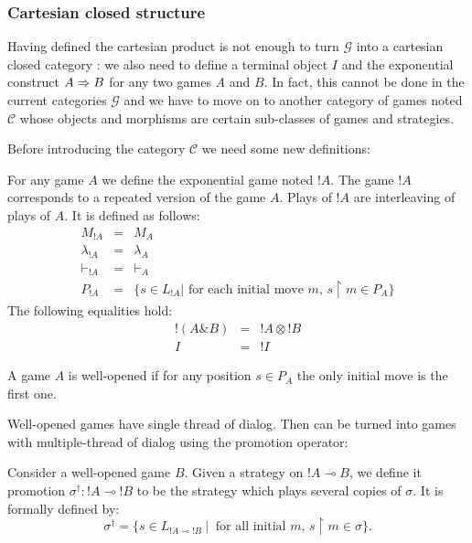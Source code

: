 \subsubsection{Cartesian closed structure}
Having defined the cartesian product is not enough to turn $\mathcal{G}$ into a cartesian closed category :
we also need to define a terminal object $I$ and the exponential construct $A \Rightarrow B$ for any two games $A$ and $B$.
In fact, this cannot be done in the current categories $\mathcal{G}$ and we have to move on to another category
of games noted $\mathcal{C}$ whose objects and morphisms are certain sub-classes of games and strategies.

Before introducing the category $\mathcal{C}$ we need some new definitions:


For any game $A$ we define the exponential game noted $!A$.
The game $!A$ corresponds to a repeated version of the game $A$. Plays of $!A$ are interleaving of plays of
$A$. It is defined as follows:
\begin{eqnarray*}
  M_{!A} &=& M_A \\
  \lambda_{!A} &=& \lambda_A \\
  \vdash_{!A} & = & \vdash_{A} \\
  P_{!A} & = & \{ s \in L_{!A} | \mbox{ for each initial move $m$, } s \upharpoonright m \in P_A \}
\end{eqnarray*}
The following equalities hold:
\begin{eqnarray*}
  !(A \& B) &=& !A \otimes !B\\
  I &=& !I
\end{eqnarray*}

\begin{dfn}
A game $A$ is well-opened if for any position $s \in P_A$ the only initial move is the first
one.
\end{dfn}

Well-opened games have single thread of dialog. Then can be turned into games with multiple-thread of dialog
using the promotion operator:

\begin{dfn}[Promotion]
Consider a well-opened game $B$.
Given a strategy on ${!A} \multimap B$, we define it promotion $\sigma^\dagger : {!A} \multimap {!B}$ to be the
strategy which plays several copies of $\sigma$. It is formally defined by:
$$ \sigma^\dagger = \{ s \in L_{{!A} \multimap !B} \ | \ \mbox{ for all initial $m$, } s \upharpoonright m \in \sigma  \}.$$
\end{dfn}

